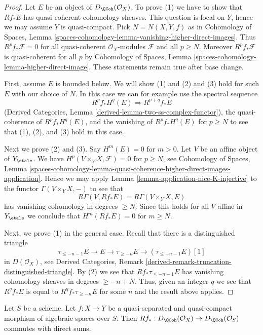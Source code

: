 \begin{proof}
Let $E$ be an object of $D_\QCoh(\mathcal{O}_X)$.
To prove (1) we have to show that $Rf_*E$ has quasi-coherent
cohomology sheaves. This question is local on $Y$, hence we may
assume $Y$ is quasi-compact. Pick $N = N(X, Y, f)$ as in
Cohomology of Spaces, Lemma
\ref{spaces-cohomology-lemma-vanishing-higher-direct-images}.
Thus $R^pf_*\mathcal{F} = 0$ for all quasi-coherent $\mathcal{O}_X$-modules
$\mathcal{F}$ and all $p \geq N$. Moreover $R^pf_*\mathcal{F}$
is quasi-coherent for all $p$ by
Cohomology of Spaces, Lemma \ref{spaces-cohomology-lemma-higher-direct-image}.
These statements remain true after base change.

\medskip\noindent
First, assume $E$ is bounded below. We will show (1) and (2) and (3) hold
for such $E$ with our choice of $N$. In this case we can for example use the
spectral sequence
$$
R^pf_*H^q(E) \Rightarrow R^{p + q}f_*E
$$
(Derived Categories, Lemma \ref{derived-lemma-two-ss-complex-functor}),
the quasi-coherence of $R^pf_*H^q(E)$, and the vanishing of $R^pf_*H^q(E)$
for $p \geq N$ to see that (1), (2), and (3) hold in this case.

\medskip\noindent
Next we prove (2) and (3). Say $H^m(E) = 0$ for $m > 0$.
Let $V$ be an affine object of $Y_\etale$.
We have $H^p(V \times_Y X, \mathcal{F}) = 0$ for $p \geq N$, see
Cohomology of Spaces, Lemma
\ref{spaces-cohomology-lemma-quasi-coherence-higher-direct-images-application}.
Hence we may apply Lemma \ref{lemma-application-nice-K-injective}
to the functor $\Gamma(V \times_Y X, -)$ to see that
$$
R\Gamma(V, Rf_*E) = R\Gamma(V \times_Y X, E)
$$
has vanishing cohomology in degrees $\geq N$. Since this holds for
all $V$ affine in $Y_\etale$ we conclude that $H^m(Rf_*E) = 0$
for $m \geq N$.

\medskip\noindent
Next, we prove (1) in the general case. Recall that there is a
distinguished triangle
$$
\tau_{\leq -n - 1}E \to E \to \tau_{\geq -n}E \to
(\tau_{\leq -n - 1}E)[1]
$$
in $D(\mathcal{O}_X)$, see Derived Categories, Remark
\ref{derived-remark-truncation-distinguished-triangle}.
By (2) we see that $Rf_*\tau_{\leq -n - 1}E$
has vanishing cohomology sheaves in degrees $\geq -n + N$.
Thus, given an integer $q$ we see that $R^qf_*E$ is equal
to $R^qf_*\tau_{\geq -n}E$ for some $n$ and the result
above applies.
\end{proof}

\begin{lemma}
\label{lemma-quasi-coherence-pushforward-direct-sums}
Let $S$ be a scheme. Let $f : X \to Y$ be a quasi-separated and
quasi-compact morphism of algebraic spaces over $S$. Then
$Rf_* : D_\QCoh(\mathcal{O}_X) \to D_\QCoh(\mathcal{O}_S)$
commutes with direct sums.
\end{lemma}

